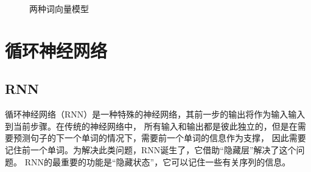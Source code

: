 \begin{figure}[htbp]
  \caption{两种词向量模型\cite{mikolov2013distributed}}
  \end{figure}

\section{循环神经网络}

\subsection{RNN}

循环神经网络（RNN）是一种特殊的神经网络，其前一步的输出将作为输入输入到当前步骤。在传统的神经网络中，
所有输入和输出都是彼此独立的，但是在需要预测句子的下一个单词的情况下，需要前一个单词的信息作为支撑，
因此需要记住前一个单词。为解决此类问题，RNN诞生了，它借助“隐藏层”解决了这个问题。
RNN的最重要的功能是“隐藏状态”，它可以记住一些有关序列的信息。


